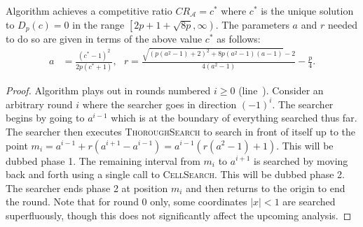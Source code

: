 \begin{theorem} 
  Algorithm  achieves a competitive ratio $CR_{\mathcal{A}}=c^*$ where $c^*$ is the unique solution to $D_p(c)=0$ in the range $\left[2p+1+\sqrt{8p},\infty\right)$. The parameters $a$ and $r$ needed to do so are given in terms of the above value $c^*$ as follows:
  \begin{align*}
    a &= \frac{(c^*-1)^2}{2p(c^*+1)}, ~~~
    r = \frac{\sqrt{\left(p(a^2-1)+2\right)^2+8p(a^2-1)(a-1)}-2}{4(a^2-1)}-\frac{p}{4}.
  \end{align*}
\end{theorem}
\begin{proof}
  Algorithm  plays out in rounds numbered $i\geq 0$ (line~). Consider an arbitrary round $i$ where the searcher goes in direction $(-1)^i$. The searcher begins by going to $a^{i-1}$ which is at the boundary of everything searched thus far. The searcher then executes \textsc{ThoroughSearch} to search in front of itself up to the point $m_i = a^{i-1} + r\left(a^{i+1}-a^{i-1}\right) = a^{i-1}\left(r(a^2-1)+1\right)$. This will be dubbed phase 1. The remaining interval from $m_i$ to $a^{i+1}$ is searched by moving back and forth using a single call to \textsc{CellSearch}. This will be dubbed phase 2. The searcher ends phase 2 at position $m_i$ and then returns to the origin to end the round. Note that for round $0$ only, some coordinates $|x|<1$ are searched superfluously, though this does not significantly affect the upcoming analysis.


\end{proof}
